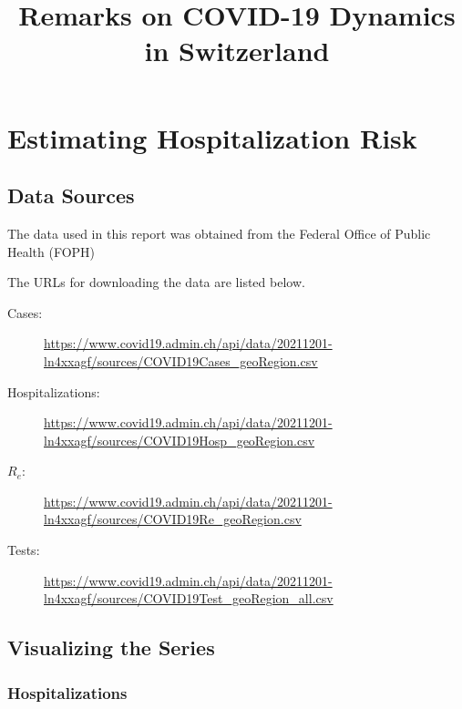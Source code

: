 \documentclass[11pt]{article}
\title{Remarks on COVID-19 Dynamics in Switzerland}
\begin{document}
    
    \maketitle
    
    

    
    \hypertarget{estimating-hospitalization-risk}{%
\section{Estimating Hospitalization
Risk}\label{estimating-hospitalization-risk}}

    \hypertarget{getting-the-data-from-foph}{%
\subsection{Data Sources}
\label{getting-the-data-from-foph}}

The data used in this report was obtained from the Federal Office of Public Health (FOPH)

The URLs for downloading the data are listed below.

\begin{description}
 \item [Cases:] \url{https://www.covid19.admin.ch/api/data/20211201-ln4xxagf/sources/COVID19Cases_geoRegion.csv}
 \item [Hospitalizations:] \url{https://www.covid19.admin.ch/api/data/20211201-ln4xxagf/sources/COVID19Hosp_geoRegion.csv}
 \item [$R_e$:] \url{https://www.covid19.admin.ch/api/data/20211201-ln4xxagf/sources/COVID19Re_geoRegion.csv}
 \item [Tests:] \url{https://www.covid19.admin.ch/api/data/20211201-ln4xxagf/sources/COVID19Test_geoRegion_all.csv}
\end{description}



    
    
    \hypertarget{visualizing-the-series}{%
\subsection{Visualizing the Series}\label{visualizing-the-series}}

    \hypertarget{hospitalizations}{%
\subsubsection{Hospitalizations}\label{hospitalizations}}
\end{document}
